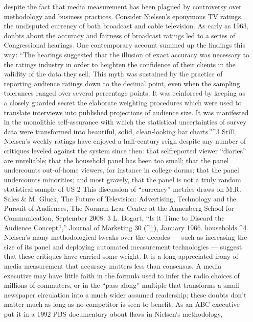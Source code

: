 despite the fact that media measurement has been plagued by controversy
over methodology and business practices.
Consider Nielsen’s eponymous TV ratings, the undisputed currency of
both broadcast and cable television. As early as 1963, doubts about the
accuracy and fairness of broadcast ratings led to a series of Congressional
hearings. One contemporary account summed up the findings this way:
``The hearings suggested that the illusion of exact accuracy was
necessary to the ratings industry in order to heighten the
confidence of their clients in the validity of the data they sell. This
myth was sustained by the practice of reporting audience ratings
down to the decimal point, even when the sampling tolerances
ranged over several percentage points. It was reinforced by keeping
as a closely guarded secret the elaborate weighting procedures
which were used to translate interviews into published projections
of audience size. It was manifested in the monolithic self‐assurance
with which the statistical uncertainties of survey data were
transformed into beautiful, solid, clean‐looking bar charts.''^{\href{#endnotes}{3}}
Still, Nielsen’s weekly ratings have enjoyed a half‐century reign despite
any number of critiques leveled against the system since then: that selfreported
viewer ``diaries'' are unreliable; that the household panel has
been too small; that the panel undercounts out‐of‐home viewers, for
instance in college dorms; that the panel undercounts minorities; and most
gravely, that the panel is not a truly random statistical sample of US
2 This discussion of ``currency'' metrics draws on M.R. Sales & M. Gluck, The Future
of Television: Advertising, Technology and the Pursuit of Audiences, The Norman
Lear Center at the Annenberg School for Communication, September 2008.
3 L. Bogart, ``Is it Time to Discard the Audience Concept?,'' Journal of Marketing 30
(^{\href{#endnotes}{1}}), January 1966.
households.^{\href{#endnotes}{4}} Nielsen’s many methodological tweaks over the decades —
such as increasing the size of its panel and deploying automated
measurement technologies — suggest that these critiques have carried
some weight.
It is a long‐appreciated irony of media measurement that accuracy matters
less than consensus. A media executive may have little faith in the
formula used to infer the radio choices of millions of commuters, or in the
``pass‐along'' multiple that transforms a small newspaper circulation into
a much wider assumed readership; these doubts don’t matter much as
long as no competitor is seen to benefit. As an ABC executive put it in a
1992 PBS documentary about flaws in Nielsenʹs methodology,
